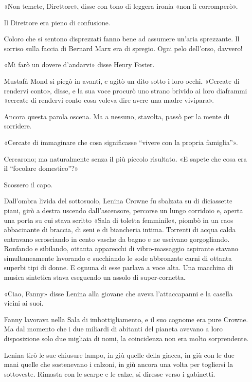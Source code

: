 \documentclass[
a5paper, %
10pt, %
twoside, 
onecolumn, %
openany, %
]{memoir}
\renewenvironment{shaded}{%
  \def\FrameCommand{\fboxsep=\FrameSep \colorbox{shadecolor}}%
  \MakeFramed{\advance\hsize-\width \FrameRestore\FrameRestore}}%
 {\endMakeFramed}
\begin{document}
«Non temete, Direttore», disse con tono di leggera ironia «non li corromperò».

Il Direttore era pieno di confusione.

\begin{shaded}
    Coloro che si sentono disprezzati fanno bene ad assumere un’aria sprezzante. Il sorriso sulla faccia di Bernard Marx era di spregio. Ogni pelo dell’orso, davvero!

«Mi farò un dovere d’andarvi» disse Henry Foster.
\end{shaded}

Mustafà Mond si piegò in avanti, e agitò un dito sotto i loro occhi. «Cercate di rendervi conto», disse, e la sua voce procurò uno strano brivido ai loro diaframmi «cercate di rendervi conto cosa voleva dire avere una madre vivipara».

Ancora questa parola oscena. Ma a nessuno, stavolta, passò per la mente di sorridere.

«Cercate di immaginare che cosa significasse “vivere con la propria famiglia”».

Cercarono; ma naturalmente senza il più piccolo risultato. «E sapete che cosa era il “focolare domestico”?»

Scossero il capo.

\begin{shaded}
    Dall’ombra livida del sottosuolo, Lenina Crowne fu sbalzata su di diciassette piani, girò a destra uscendo dall’ascensore, percorse un lungo corridoio e, aperta una porta su cui stava scritto «Sala di toletta femminile», piombò in un caos abbacinante di braccia, di seni e di biancheria intima. Torrenti di acqua calda entravano scrosciando in cento vasche da bagno e ne uscivano gorgogliando. Ronfando e sibilando, ottanta apparecchi di vibro-massaggio aspirante stavano simultaneamente lavorando e succhiando le sode abbronzate carni di ottanta superbi tipi di donne. E ognuna di esse parlava a voce alta. Una macchina di musica sintetica stava eseguendo un assolo di super-cornetta.

    «Ciao, Fanny» disse Lenina alla giovane che aveva l’attaccapanni e la casella vicini ai suoi.

Fanny lavorava nella Sala di imbottigliamento, e il suo cognome era pure Crowne. Ma dal momento che i due miliardi di abitanti del pianeta avevano a loro disposizione solo due migliaia di nomi, la coincidenza non era molto sorprendente.

Lenina tirò le sue chiusure lampo, in giù quelle della giacca, in giù con le due mani quelle che sostenevano i calzoni, in giù ancora una volta per togliersi la sottoveste. Rimasta con le scarpe e le calze, si diresse verso i gabinetti.
\end{shaded}
\end{document}
